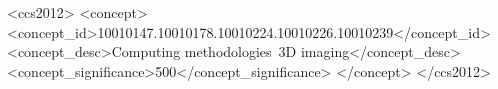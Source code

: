 \documentclass[sigconf]{acmart}
\begin{document}
\begin{CCSXML}
<ccs2012>
   <concept>
       <concept_id>10010147.10010178.10010224.10010226.10010239</concept_id>
       <concept_desc>Computing methodologies~3D imaging</concept_desc>
       <concept_significance>500</concept_significance>
       </concept>
 </ccs2012>
\end{CCSXML}







\maketitle



















\end{document}
